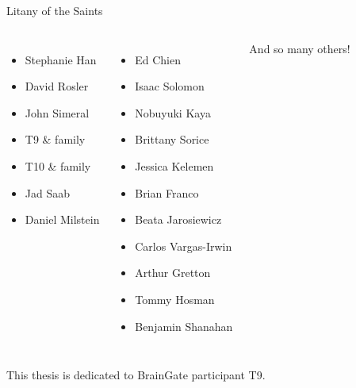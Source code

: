 \documentclass[aspectratio=169,19pt,xetex,handout]{beamer}
\begin{document}
\begin{frame}{Litany of the Saints}
\begin{columns}
\begin{itemize}
    \item Stephanie Han
    \item David Rosler
    \item John Simeral
    \item T9 \& family
    \item T10 \& family
    \item Jad Saab
    \item Daniel Milstein
\end{itemize}
\column[t]{0.25\paperwidth}
\begin{itemize}
    \item Ed Chien
    \item Isaac Solomon
    \item Nobuyuki Kaya %
    \item Brittany Sorice
    \item Jessica Kelemen
    \item Brian Franco
    \item Beata Jarosiewicz
    \item Carlos Vargas-Irwin
    \item Arthur Gretton
    \item Tommy Hosman
    \item Benjamin Shanahan
\end{itemize}
And so many others!
\end{columns}
\end{frame}



\begin{frame}{}
\Huge \centering \minion This thesis is dedicated to BrainGate participant T9.
\end{frame}
\end{document}
